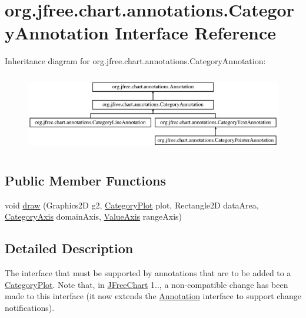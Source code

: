 \hypertarget{interfaceorg_1_1jfree_1_1chart_1_1annotations_1_1_category_annotation}{}\section{org.\+jfree.\+chart.\+annotations.\+Category\+Annotation Interface Reference}
\label{interfaceorg_1_1jfree_1_1chart_1_1annotations_1_1_category_annotation}
Inheritance diagram for org.\+jfree.\+chart.\+annotations.\+Category\+Annotation\+:\begin{figure}[H]
\begin{center}
\leavevmode
\includegraphics[height=3.435583cm]{interfaceorg_1_1jfree_1_1chart_1_1annotations_1_1_category_annotation}
\end{center}
\end{figure}
\subsection*{Public Member Functions}
\begin{DoxyCompactItemize}
\item 
void \mbox{\hyperlink{interfaceorg_1_1jfree_1_1chart_1_1annotations_1_1_category_annotation_adc8211cfc0b7246dce754e68478ae948}{draw}} (Graphics2D g2, \mbox{\hyperlink{classorg_1_1jfree_1_1chart_1_1plot_1_1_category_plot}{Category\+Plot}} plot, Rectangle2D data\+Area, \mbox{\hyperlink{classorg_1_1jfree_1_1chart_1_1axis_1_1_category_axis}{Category\+Axis}} domain\+Axis, \mbox{\hyperlink{classorg_1_1jfree_1_1chart_1_1axis_1_1_value_axis}{Value\+Axis}} range\+Axis)
\end{DoxyCompactItemize}


\subsection{Detailed Description}
The interface that must be supported by annotations that are to be added to a \mbox{\hyperlink{}{Category\+Plot}}. Note that, in \mbox{\hyperlink{classorg_1_1jfree_1_1chart_1_1_j_free_chart}{J\+Free\+Chart}} 1.., a non-\/compatible change has been made to this interface (it now extends the \mbox{\hyperlink{interfaceorg_1_1jfree_1_1chart_1_1annotations_1_1_annotation}{Annotation}} interface to support change notifications). 


